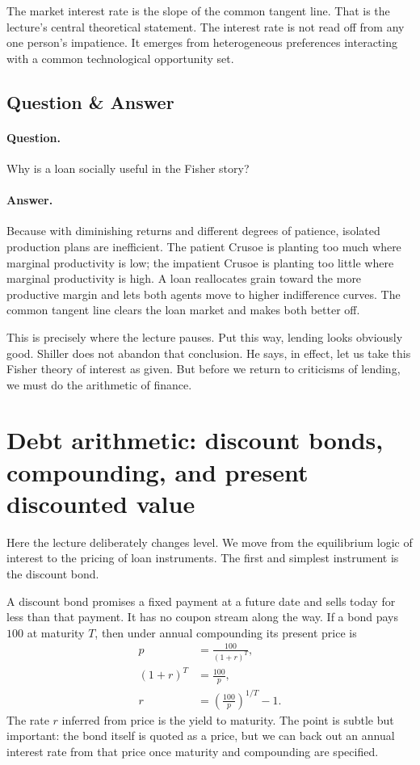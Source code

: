 The market interest rate is the slope of the common tangent line. That is the lecture's central theoretical statement. The interest rate is not read off from any one person's impatience. It emerges from heterogeneous preferences interacting with a common technological opportunity set.

\subsection{Question \& Answer}

\paragraph{Question.} Why is a loan socially useful in the Fisher story?

\paragraph{Answer.} Because with diminishing returns and different degrees of patience, isolated production plans are inefficient. The patient Crusoe is planting too much where marginal productivity is low; the impatient Crusoe is planting too little where marginal productivity is high. A loan reallocates grain toward the more productive margin and lets both agents move to higher indifference curves. The common tangent line clears the loan market and makes both better off.

This is precisely where the lecture pauses. Put this way, lending looks obviously good. Shiller does not abandon that conclusion. He says, in effect, let us take this Fisher theory of interest as given. But before we return to criticisms of lending, we must do the arithmetic of finance.

\section{Debt arithmetic: discount bonds, compounding, and present discounted value}

Here the lecture deliberately changes level. We move from the equilibrium logic of interest to the pricing of loan instruments. The first and simplest instrument is the discount bond.

A discount bond promises a fixed payment at a future date and sells today for less than that payment. It has no coupon stream along the way. If a bond pays \(100\) at maturity \(T\), then under annual compounding its present price is
\begin{align}
p &= \frac{100}{(1+r)^T}, \\
(1+r)^T &= \frac{100}{p}, \\
r &= \left(\frac{100}{p}\right)^{1/T}-1.
\end{align}
The rate \(r\) inferred from price is the yield to maturity. The point is subtle but important: the bond itself is quoted as a price, but we can back out an annual interest rate from that price once maturity and compounding are specified.

